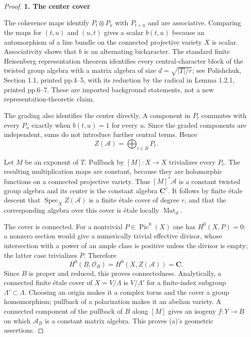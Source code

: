 \documentclass[11pt,a4paper]{article}
\theoremstyle{definition}
\begin{document}
\begin{proof}
\par

\medskip\noindent\textbf{1. The center cover}\quad

The coherence maps identify \(P_t\otimes P_u\) with \(P_{t+u}\) and are associative. Comparing the maps for \((t,u)\) and \((u,t)\) gives a scalar \(b(t,u)\) because an automorphism of a line bundle on the connected projective variety \(X\) is scalar. Associativity shows that \(b\) is an alternating bicharacter. The standard finite Heisenberg representation theorem identifies every central-character block of the twisted group algebra with a matrix algebra of size \(d=\sqrt{|T|/r}\); see Polishchuk, Section 1.1, printed pp.4--5, with its reduction by the radical in Lemma 1.2.1, printed pp.6--7. These are imported background statements, not a new representation-theoretic claim.

The grading also identifies the center directly. A component in \(P_t\) commutes with every \(P_u\) exactly when \(b(t,u)=1\) for every \(u\). Since the graded components are independent, sums do not introduce further central terms. Hence \[
 Z(\mathscr A)=\bigoplus_{t\in R}P_t.
 \tag{S38.12}
\]

Let \(M\) be an exponent of \(T\). Pullback by \([M]:X\to X\) trivializes every \(P_t\). The resulting multiplication maps are constant, because they are holomorphic functions on a connected projective variety. Thus \([M]^*\mathscr A\) is a constant twisted group algebra and its center is the constant algebra \(\mathbf C^r\). It follows by finite étale descent that \(\operatorname{Spec}_X Z(\mathscr A)\) is a finite étale cover of degree \(r\), and that the corresponding algebra over this cover is étale locally \(\operatorname{Mat}_d\).

The cover is connected. For a nontrivial \(P\in\operatorname{Pic}^0(X)\) one has \(H^0(X,P)=0\): a nonzero section would give a numerically trivial effective divisor, whose intersection with a power of an ample class is positive unless the divisor is empty; the latter case trivializes \(P\). Therefore \[
 H^0(B,\mathcal O_B)=H^0(X,Z(\mathscr A))=\mathbf C.
\] Since \(B\) is proper and reduced, this proves connectedness. Analytically, a connected finite étale cover of \(X=V/\Lambda\) is \(V/\Lambda'\) for a finite-index subgroup \(\Lambda'\subset\Lambda\). Choosing an origin makes it a complex torus and the cover a group homomorphism; pullback of a polarization makes it an abelian variety. A connected component of the pullback of \(B\) along \([M]\) gives an isogeny \(f:Y\to B\) on which \(\mathscr A_B\) is a constant matrix algebra. This proves (a)'s geometric assertions.


\end{proof}
\end{document}
